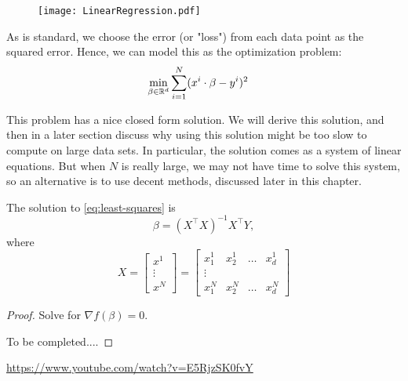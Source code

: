 \documentclass[../open-optimization/open-optimization.tex]{subfiles}
\begin{document}

\begin{figure}[H]
\begin{center}



\texttt{[image: LinearRegression.pdf]}\footnotemark
\end{center}
\end{figure}



As is standard, we choose the error (or "loss") from each data point as the squared error.  Hence, we can model this as the optimization problem:
\begin{align}
\label{eq:least-squares}
\min_{\beta \in {\mathbb{R}}^d} & \sum_{i=1}^N (x^i \cdot \beta - y^i)^2
\end{align}

This problem has a nice closed form solution.  We will derive this solution, and then in a later section discuss why using this solution might be too  slow to compute on large data sets.  In particular, the solution comes as a system of linear equations.  But when $N$ is really large, we may not have time to solve this system, so an alternative is to use decent methods, discussed later in this chapter.

\begin{theorem}
The solution to \eqref{eq:least-squares} is 
\begin{equation}
\beta = (X^\top X)^{-1} X^\top Y,
\end{equation}
where 
$$X = 
\begin{bmatrix}
x^1\\
\vdots \\
x^N
\end{bmatrix}
= 
\begin{bmatrix}
x^1_1 & x^1_2 & \dots & x^1_d\\
\vdots \\
x^N_1 & x^N_2 & \dots & x^N_d
\end{bmatrix}
$$
\end{theorem}
\begin{proof}
Solve for $\nabla f(\beta) = 0$.

To be completed....
\end{proof}


\url{https://www.youtube.com/watch?v=E5RjzSK0fvY}
\end{document}
